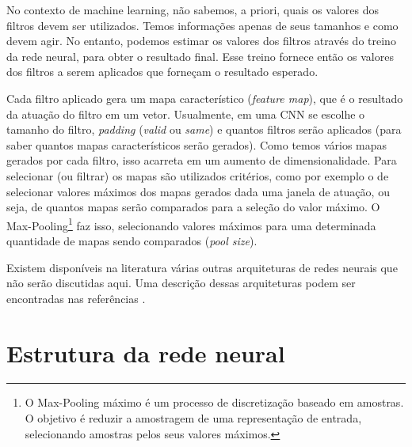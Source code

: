 \documentclass[a4paper,12pt,oneside]{book}
\begin{document}
\par No contexto de machine learning, não sabemos, a priori, quais os valores dos filtros devem ser utilizados. Temos informações apenas de seus tamanhos e como devem agir. No entanto, podemos estimar os valores dos filtros através do treino da rede neural, para obter o resultado final. Esse treino fornece então os valores dos filtros a serem aplicados que forneçam o resultado esperado.  

\par Cada filtro aplicado gera um mapa característico (\textit{feature map}), que é o resultado da atuação do filtro em um vetor. Usualmente, em uma CNN se escolhe o tamanho do filtro, \textit{padding} (\textit{valid} ou \textit{same}) e quantos filtros serão aplicados (para saber quantos mapas característicos serão gerados). Como temos vários mapas gerados por cada filtro, isso acarreta em um aumento de dimensionalidade. Para selecionar (ou filtrar) os mapas são utilizados critérios, como por exemplo o de selecionar valores máximos dos mapas gerados dada uma janela de atuação, ou seja, de quantos mapas serão comparados para a seleção do valor máximo. O Max-Pooling\footnote{O Max-Pooling máximo é um processo de discretização baseado em amostras. O objetivo é reduzir a amostragem de uma representação de entrada, selecionando amostras pelos seus valores máximos.} faz isso, selecionando valores máximos para uma determinada quantidade de mapas sendo comparados (\textit{pool size}).


\par Existem disponíveis na literatura várias outras arquiteturas de redes neurais que não serão discutidas aqui. Uma descrição dessas arquiteturas podem ser encontradas nas referências \cite{rbfbook, RNN_fund}.

\section{Estrutura da rede neural}
\end{document}
